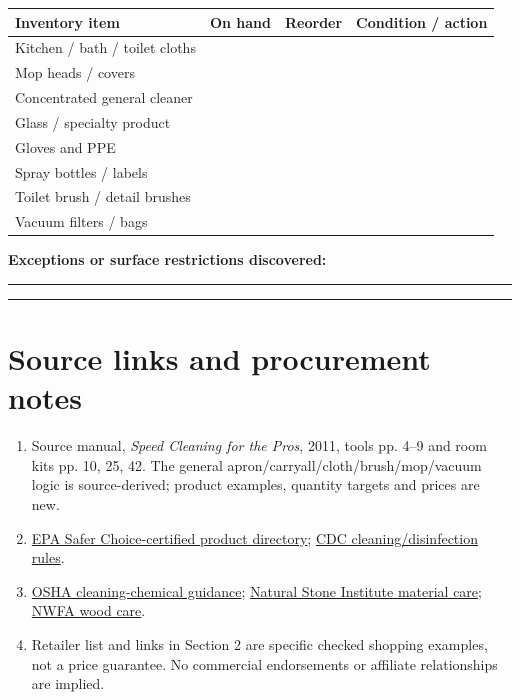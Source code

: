 \documentclass[10pt,letterpaper,oneside]{article}
\newcommand{\refurl}[2]{\href{#2}{#1}}
\newcommand{\smalltable}{\par\small\renewcommand{\arraystretch}{1.24}}
\newcommand{\restorenormalfonttable}{\par\normalsize\renewcommand{\arraystretch}{1}}
\begin{document}
\smalltable\begin{tabularx}{\linewidth}{X p{.15\linewidth}p{.15\linewidth}p{.16\linewidth}}\toprule
Inventory item & On hand & Reorder & Condition / action\\\midrule
Kitchen / bath / toilet cloths & & & \\
Mop heads / covers & & & \\
Concentrated general cleaner & & & \\
Glass / specialty product & & & \\
Gloves and PPE & & & \\
Spray bottles / labels & & & \\
Toilet brush / detail brushes & & & \\
Vacuum filters / bags & & & \\
\bottomrule\end{tabularx}\restorenormalfonttable
\vspace{14pt}\textbf{Exceptions or surface restrictions discovered:}\par\vspace{14pt}\rule{\linewidth}{.3pt}\par\vspace{14pt}\rule{\linewidth}{.3pt}
\section{Source links and procurement notes}
\begin{enumerate}
\item Source manual, \emph{Speed Cleaning for the Pros}, 2011, tools pp. 4--9 and room kits pp. 10, 25, 42. The general apron/carryall/cloth/brush/mop/vacuum logic is source-derived; product examples, quantity targets and prices are new.
\item \refurl{EPA Safer Choice-certified product directory}{https://www.epa.gov/saferchoice/products}; \refurl{CDC cleaning/disinfection rules}{https://www.cdc.gov/hygiene/about/when-and-how-to-clean-and-disinfect-your-home.html}.
\item \refurl{OSHA cleaning-chemical guidance}{https://www.osha.gov/sites/default/files/publications/OSHA3512.pdf}; \refurl{Natural Stone Institute material care}{https://www.naturalstoneinstitute.org/consumers/care/}; \refurl{NWFA wood care}{https://woodfloors.org/maintenance/}.
\item Retailer list and links in Section 2 are specific checked shopping examples, not a price guarantee. No commercial endorsements or affiliate relationships are implied.
\end{enumerate}
\end{document}
